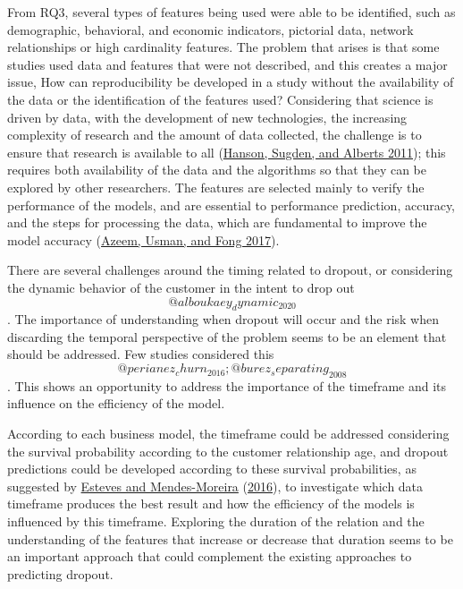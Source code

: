 \documentclass[
  12pt,
]{article}
\begin{document}
From RQ3, several types of features being used were able to be identified, such
as demographic, behavioral, and economic indicators, pictorial data, network
relationships or high cardinality features. The problem that arises is that some
studies used data and features that were not described, and this creates a major
issue, How can reproducibility be developed in a study without the availability
of the data or the identification of the features used? Considering that science
is driven by data, with the development of new technologies, the increasing
complexity of research and the amount of data collected, the challenge is to
ensure that research is available to all (\protect\hyperlink{ref-Hanson_Sugden_Alberts_2011}{Hanson, Sugden, and Alberts 2011}); this
requires both availability of the data and the algorithms so that they can be
explored by other researchers. The features are selected mainly to verify the
performance of the models, and are essential to performance prediction,
accuracy, and the steps for processing the data, which are fundamental to
improve the model accuracy (\protect\hyperlink{ref-azeem_churn_2017}{Azeem, Usman, and Fong 2017}).

There are several challenges around the timing related to dropout, or
considering the dynamic behavior of the customer in the intent to drop out
\[@alboukaey_dynamic_2020\]. The importance of understanding when dropout will
occur and the risk when discarding the temporal perspective of the problem seems
to be an element that should be addressed. Few studies considered this
\[@perianez_churn_2016; @burez_separating_2008\]. This shows an opportunity to
address the importance of the timeframe and its influence on the efficiency of
the model.

According to each business model, the timeframe could be addressed considering
the survival probability according to the customer relationship age, and dropout
predictions could be developed according to these survival probabilities, as
suggested by \protect\hyperlink{ref-esteves_churn_2016}{Esteves and Mendes-Moreira} (\protect\hyperlink{ref-esteves_churn_2016}{2016}), to investigate which data timeframe produces
the best result and how the efficiency of the models is influenced by this
timeframe. Exploring the duration of the relation and the understanding of the
features that increase or decrease that duration seems to be an important
approach that could complement the existing approaches to predicting dropout.
\end{document}
